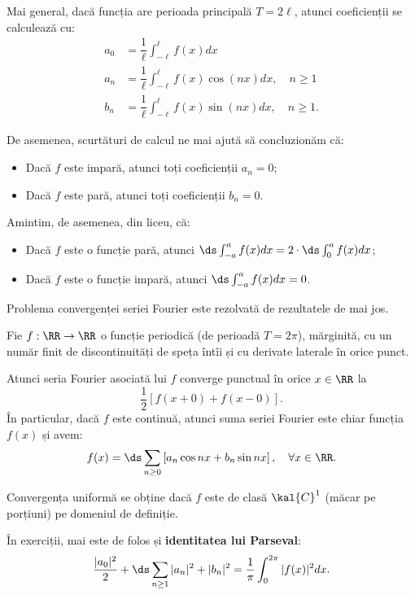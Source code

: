 Mai general, dacă funcția are perioada principală $ T = 2 \ell $, atunci coeficienții se calculează cu:
\begin{align*}
    a_0 &= \dfrac{1}{\ell} \int_{-\ell}^\ell f(x) dx \\
    a_n &= \dfrac{1}{\ell} \int_{-\ell}^\ell f(x) \cos (nx) dx, \quad n \geq 1 \\
    b_n &= \dfrac{1}{\ell} \int_{-\ell}^\ell f(x) \sin (nx) dx, \quad n \geq 1.
\end{align*}

De asemenea, scurtături de calcul ne mai ajută să concluzionăm că:
\begin{itemize}
    \item Dacă $ f $ este impară, atunci toți coeficienții $ a_n = 0 $;
    \item Dacă $ f $ este pară, atunci toți coeficienții $ b_n = 0 $.
\end{itemize}

Amintim, de asemenea, din liceu, că:
\begin{itemize}
    \item Dacă $ f $ este o funcție pară, atunci $ \ds\int_{-a}^a f(x) dx = 2 \cdot \ds\int_0^a f(x) dx $;
    \item Dacă $ f $ este o funcție impară, atunci $ \ds\int_{-a}^a f(x) dx = 0 $.
\end{itemize}

Problema convergenței seriei Fourier este rezolvată de rezultatele de mai jos.

\begin{theorem}[G.\ L.\ Dirichlet]
    \label{thm:dirichlet}
    Fie $ f : \RR \to \RR $ o funcție periodică (de perioadă $ T = 2\pi $),
    mărginită, cu un număr finit de discontinuități de speța întîi și cu derivate
    laterale în orice punct.

    Atunci seria Fourier asociată lui $ f $ converge punctual în orice $ x \in \RR $ la
    \[
        \dfrac{1}{2} \left[ f(x + 0) + f(x - 0) \right].
    \]
    În particular, dacă $ f $ este continuă, atunci suma seriei Fourier este chiar
    funcția $ f(x) $ și avem:
    \[
        f(x) = \ds\sum_{n \geq 0} \left[ a_n \cos nx + b_n \sin nx \right], \quad \forall x \in \RR.
    \]
    
    Convergența uniformă se obține dacă $ f $ este de clasă $ \kal{C}^1 $ (măcar pe porțiuni)
    pe domeniul de definiție.
\end{theorem}

În exerciții, mai este de folos și \textbf{identitatea lui Parseval}:
\[
    \dfrac{|a_0|^2}{2} + \ds\sum_{n \geq 1} |a_n|^2 + |b_n|^2 = \dfrac{1}{\pi} \int_0^{2\pi} |f(x)|^2 dx.
\]

